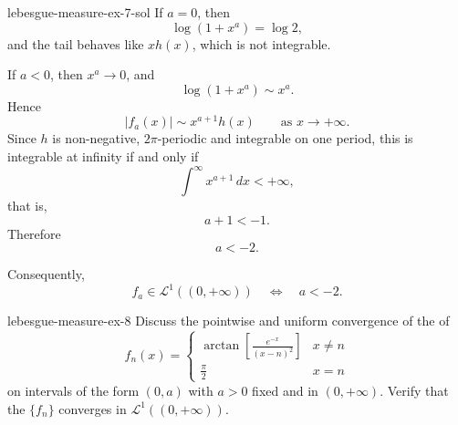 \documentclass[preview]{standalone}
\begin{document}
\begin{snippetsolution}{lebesgue-measure-ex-7-sol}{}
    If \(a=0\), then
    \[
        \log(1+x^a)=\log 2,
    \]
    and the tail behaves like \(x h(x)\), which is not integrable.

    If \(a<0\), then \(x^a\to0\), and
    \[
        \log(1+x^a)\sim x^a.
    \]
    Hence
    \[
        |f_a(x)|
        \sim
        x^{a+1}h(x)
        \qquad\text{as }x\to+\infty.
    \]
    Since \(h\) is non-negative, \(2\pi\)-periodic and integrable on one period,
    this is integrable at infinity if and only if
    \[
        \int^\infty x^{a+1}\,dx<+\infty,
    \]
    that is,
    \[
        a+1<-1.
    \]
    Therefore
    \[
        a<-2.
    \]

    Consequently,
    \[
        f_a\in\mathcal L^1((0,+\infty))
        \quad\Longleftrightarrow\quad
        a<-2.
    \]
\end{snippetsolution}

\begin{snippetexercise}{lebesgue-measure-ex-8}{}
    Discuss the pointwise and uniform convergence of the \sequence of \function[functions]
    \[
        f_n(x) = \begin{cases}
            \arctan \left[
                \frac{e^{-x}}{(x-n)^2}
            \right] & x \neq n \\
            \frac\pi2 & x = n
        \end{cases}
    \]
    on intervals of the form \((0,a)\) with \(a>0\) fixed and in \((0,+\infty)\).
    Verify that the \sequence \(\{f_n\}\) converges in \(\mathcal L^1((0,+\infty))\).
\end{snippetexercise}
\end{document}
